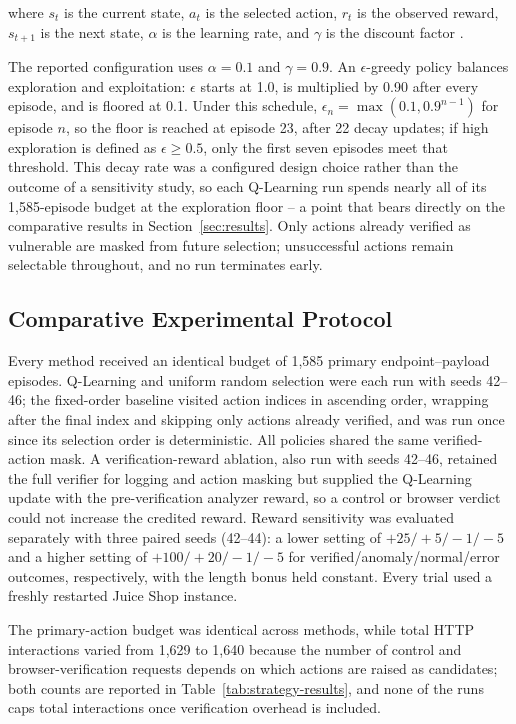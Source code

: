 \documentclass[conference, a4paper]{IEEEtran}
\begin{document}
where $s_t$ is the current state, $a_t$ is the selected action,
$r_t$ is the observed reward, $s_{t+1}$ is the next state, $\alpha$
is the learning rate, and $\gamma$ is the discount factor
\cite{sutton2018}.

The reported configuration uses $\alpha=0.1$ and $\gamma=0.9$. An
$\epsilon$-greedy policy balances exploration and exploitation:
$\epsilon$ starts at 1.0, is multiplied by 0.90 after every
episode, and is floored at 0.1. Under this schedule,
$\epsilon_n=\max(0.1,0.9^{n-1})$ for episode $n$, so the floor is
reached at episode 23, after 22 decay updates; if high exploration
is defined as $\epsilon\geq0.5$, only the first seven episodes meet
that threshold. This decay rate was a configured design choice
rather than the outcome of a sensitivity study, so each Q-Learning
run spends nearly all of its 1,585-episode budget at the
exploration floor -- a point that bears directly on the comparative
results in Section~\ref{sec:results}. Only actions already verified
as vulnerable are masked from future selection; unsuccessful
actions remain selectable throughout, and no run terminates early.

\subsection{Comparative Experimental Protocol}
\label{sec:protocol}

Every method received an identical budget of 1,585 primary
endpoint--payload episodes. Q-Learning and uniform random selection
were each run with seeds 42--46; the fixed-order baseline visited
action indices in ascending order, wrapping after the final index
and skipping only actions already verified, and was run once since
its selection order is deterministic. All policies shared the same
verified-action mask. A verification-reward ablation, also run with
seeds 42--46, retained the full verifier for logging and action
masking but supplied the Q-Learning update with the
pre-verification analyzer reward, so a control or browser verdict
could not increase the credited reward. Reward sensitivity was
evaluated separately with three paired seeds (42--44): a lower
setting of $+25/+5/-1/-5$ and a higher setting of $+100/+20/-1/-5$
for verified/anomaly/normal/error outcomes, respectively, with the
length bonus held constant. Every trial used a freshly restarted
Juice Shop instance.

The primary-action budget was identical across methods, while total
HTTP interactions varied from 1,629 to 1,640 because the number of
control and browser-verification requests depends on which actions
are raised as candidates; both counts are reported in
Table~\ref{tab:strategy-results}, and none of the runs caps total
interactions once verification overhead is included.
\end{document}
